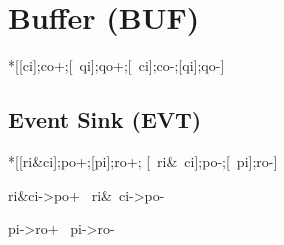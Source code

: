 \documentclass[aer.tex]{subfiles}
\begin{document}
\section{Buffer (BUF)}
\begin{hse}
*[[ci];co+;[~qi];qo+;[~ci];co-;[qi];qo-]
\end{hse}
\subsection{Event Sink (EVT)}
\begin{hse}
*[[ri&ci];po+;[pi];ro+;
   [~ri&~ci];po-;[~pi];ro-]
\end{hse}

\begin{prs}
 ri&ci->po+
~ri&~ci->po-

 pi->ro+
~pi->ro-
\end{prs}
\end{document}

